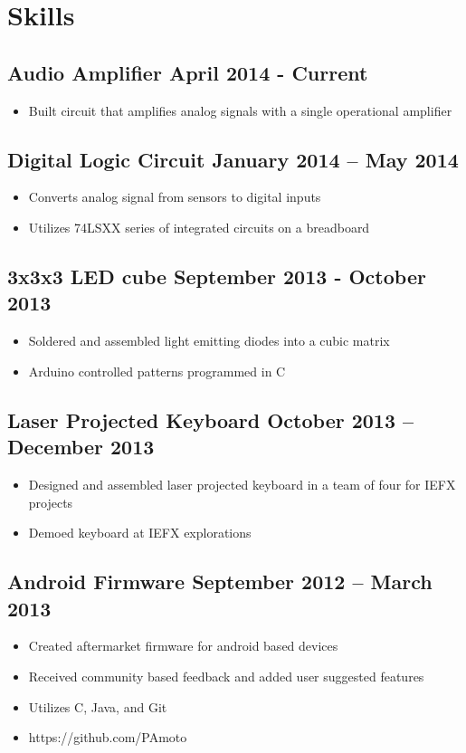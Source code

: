 \documentclass[11pt]{article}
\begin{document}
	\section*{Skills}
		\subsection*{Audio Amplifier \hfill April 2014 - Current}
		\begin{itemize}
			\item Built circuit that amplifies analog signals with a single operational amplifier
		\end{itemize}
		\subsection*{Digital Logic Circuit \hfill January 2014 – May 2014}
		\begin{itemize}
			\item Converts analog signal from sensors to digital inputs
			\item Utilizes 74LSXX series of integrated circuits on a breadboard
		\end{itemize}
		\subsection*{3x3x3 LED cube \hfill September 2013 - October 2013}
		\begin{itemize}
			\item Soldered and assembled light emitting diodes into a cubic matrix
			\item Arduino controlled patterns programmed in C
		\end{itemize}
		\subsection*{Laser Projected Keyboard \hfill October 2013 – December 2013}
		\begin{itemize}
			\item Designed and assembled laser projected keyboard in a team of four for IEFX projects
			\item Demoed keyboard at IEFX explorations
		\end{itemize}
		\subsection*{Android Firmware \hfill September 2012 – March 2013}
		\begin{itemize}
			\item Created aftermarket firmware for android based devices
			\item Received community based feedback and added user suggested features
			\item Utilizes C, Java, and Git
			\item https://github.com/PAmoto
		\end{itemize}
	
\end{document}
